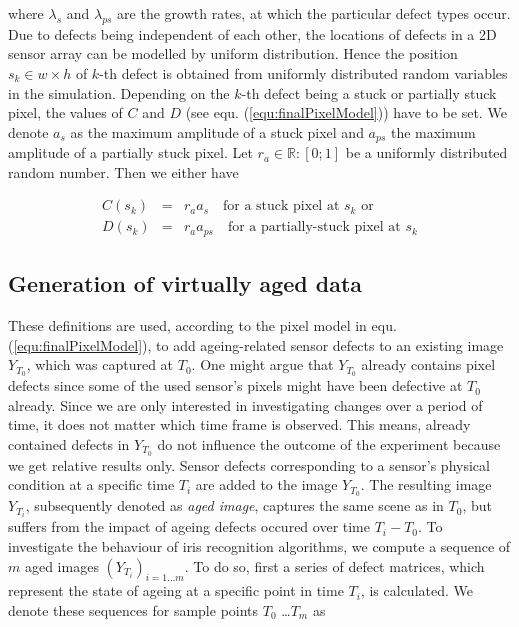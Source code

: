 \documentclass[10pt,twocolumn,letterpaper]{article}
\begin{document}
where $\lambda_s$ and $\lambda_{ps}$ are the growth rates, at which the particular defect types occur. Due to defects being independent of each other, the locations of defects in a 2D sensor array can be modelled by uniform distribution. Hence the position  $s_k \in {w \times h}$ of $k$-th defect is obtained from uniformly distributed random variables in the simulation. Depending on the $k$-th defect being a stuck or partially stuck pixel, the values of $C$ and $D$ (see equ. (\ref{equ:finalPixelModel})) have to be set. We denote $a_s$ as the maximum amplitude of a stuck pixel and $a_{ps}$ the maximum amplitude of a partially stuck pixel. Let $r_a \in \mathbb{R}:[0;1]$ be a uniformly distributed random number. Then we either have

\begin{eqnarray}
   C({s_k})  & = & r_a  a_s \quad \text{for a stuck pixel at } s_k \text{ or} \label{equ:stucks} \\
   D({s_k}) & = &  r_a a_{ps} \quad \text{for a partially-stuck pixel at } s_k \label{equ:partiallyStuck}
\end{eqnarray}


\subsection{Generation of virtually aged data}
These definitions are used, according to the pixel model in equ. (\ref{equ:finalPixelModel}), to add ageing-related sensor defects to an existing image $Y_{T_0}$, which was captured at ${T_0}$. One might argue that $Y_{T_0}$ already contains pixel defects since some of the used sensor's pixels might have been defective at $T_0$ already. Since we are only interested in investigating changes over a period of time, it does not matter which time frame is observed. This means, already contained defects in $Y_{T_0}$ do not influence the outcome of the experiment because we get relative results only. Sensor defects corresponding to a sensor's physical condition at a specific time $T_i$ are added to the image $Y_{T_0}$. The resulting image $Y_{T_i}$, subsequently denoted as \emph{aged image}, captures the same scene as in $T_0$, but suffers from the impact of ageing defects occured over time ${T_i} - {T_0}$. To investigate the behaviour of iris recognition algorithms, we compute a sequence of $m$ aged images $(Y_{T_i})_{i=1 \dots m}$. To do so, first a series of defect matrices, which represent the state of ageing at a specific point in time $T_i$, is calculated. We denote these sequences for sample points $T_0$ \dots $T_m$ as
\end{document}
